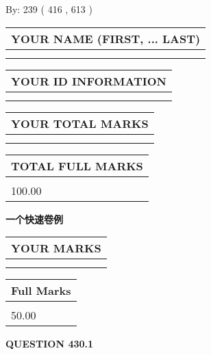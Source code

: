 \documentclass{ctexart}
\begin{document}
   
\hspace{1.0in} By: 
 239 ( 416 ,  613 )
   
   
   
   
\newpage 
\setcounter{page}{ 
   430001 } 
   
   
   
   
\noindent\begin{tabular}{|l|}
\hline
YOUR NAME (FIRST, ... LAST)  \\
\hline
 \\ 
 \\ 
\hline
\end{tabular}
\hspace{0.05in} \begin{tabular}{|l|}
\hline
 YOUR   ID   INFORMATION  \\
\hline
 \\ 
 \\ 
\hline
\end{tabular}
   
   
\vspace{0.2in}\noindent\begin{tabular}{|l|}
\hline
YOUR TOTAL MARKS  \\
\hline
 \\ 
 \\ 
\hline
\end{tabular}
\hspace{0.05in} \begin{tabular}{|l|}
\hline
TOTAL FULL MARKS  \\
\hline
 \\ 
100.00 \\
\hline
\end{tabular}
   
   
 \vspace{0.2in}
{\LARGE {\textbf{ 一个快速卷例}}}
   
   
  
\vspace{0.2in}
  
\noindent\begin{tabular}{|l|}
\hline
 YOUR MARKS  \\
\hline
 \\ 
 \\ 
\hline
\end{tabular}
\hspace{0.05in} \begin{tabular}{|l|}
\hline
 Full Marks  \\
\hline
 \\ 
50.00 \\
\hline
\end{tabular}
{\textbf{\Large{QUESTION
430.1 
}}}
  
\end{document}
